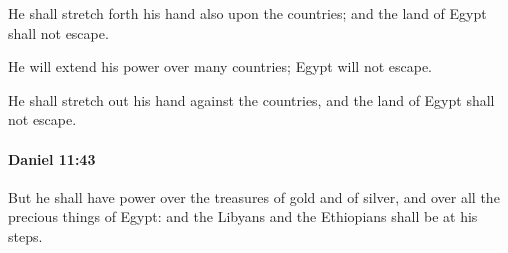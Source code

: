 			\begin{versebox}
					\item[BHS] 
					\item[LXX] 
					\item[ASV] He shall stretch forth his hand also upon the countries; and the land of Egypt shall not escape.
					\item[NIV] He will extend his power over many countries; Egypt will not escape.
					\item[NRSV] He shall stretch out his hand against the countries, and the land of Egypt shall not escape.
			\end{versebox}

		\paragraph{Daniel 11:43} %
			\label{DANIEL-11-43}

			But he shall have power over the treasures of gold and of silver, and over all the precious things of Egypt: and the Libyans and the Ethiopians shall be at his steps.

